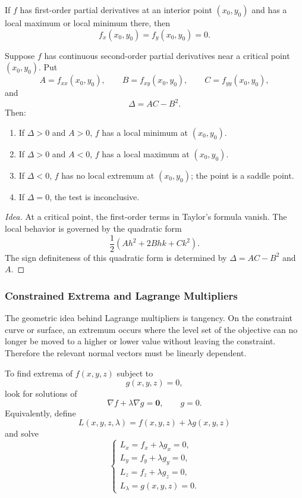 \begin{theorem}
If $f$ has first-order partial derivatives at an interior point $(x_0,y_0)$ and has a local maximum or local minimum there, then
\[
    f_x(x_0,y_0)=f_y(x_0,y_0)=0.
\]
\end{theorem}

\begin{theorem}
Suppose $f$ has continuous second-order partial derivatives near a critical point $(x_0,y_0)$. Put
\[
    A=f_{xx}(x_0,y_0),\qquad B=f_{xy}(x_0,y_0),\qquad C=f_{yy}(x_0,y_0),
\]
and
\[
    \Delta=AC-B^2.
\]
Then:
\begin{enumerate}
    \item If $\Delta>0$ and $A>0$, $f$ has a local minimum at $(x_0,y_0)$.
    \item If $\Delta>0$ and $A<0$, $f$ has a local maximum at $(x_0,y_0)$.
    \item If $\Delta<0$, $f$ has no local extremum at $(x_0,y_0)$; the point is a saddle point.
    \item If $\Delta=0$, the test is inconclusive.
\end{enumerate}
\end{theorem}

\begin{proof}[Idea]
At a critical point, the first-order terms in Taylor's formula vanish. The local behavior is governed by the quadratic form
\[
    \frac12\left(Ah^2+2Bhk+Ck^2\right).
\]
The sign definiteness of this quadratic form is determined by $\Delta=AC-B^2$ and $A$.
\end{proof}

\subsubsection{Constrained Extrema and Lagrange Multipliers}

The geometric idea behind Lagrange multipliers is tangency. On the constraint curve or surface, an extremum occurs where the level set of the objective can no longer be moved to a higher or lower value without leaving the constraint. Therefore the relevant normal vectors must be linearly dependent.

\begin{theorem}
To find extrema of $f(x,y,z)$ subject to
\[
    g(x,y,z)=0,
\]
look for solutions of
\[
    \nabla f+\lambda\nabla g=\mathbf{0},
    \qquad
    g=0.
\]
Equivalently, define
\[
    L(x,y,z,\lambda)=f(x,y,z)+\lambda g(x,y,z)
\]
and solve
\[
\begin{cases}
    L_x=f_x+\lambda g_x=0,\\
    L_y=f_y+\lambda g_y=0,\\
    L_z=f_z+\lambda g_z=0,\\
    L_\lambda=g(x,y,z)=0.
\end{cases}
\]
\end{theorem}

